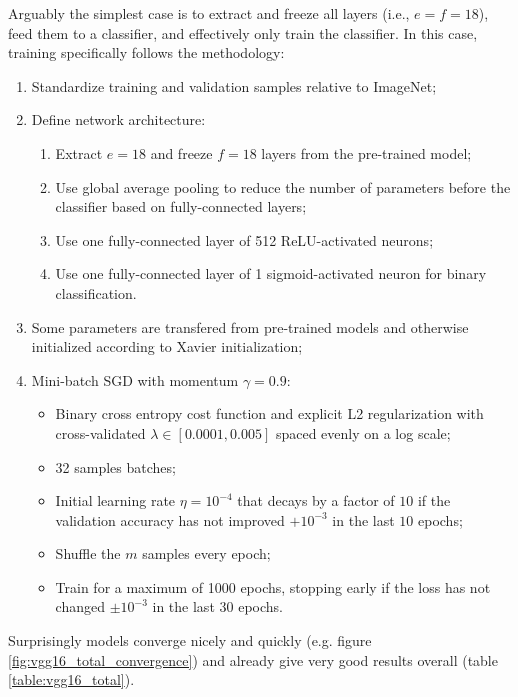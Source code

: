 Arguably the simplest case is to extract and freeze all layers (i.e., $e = f = 18$), feed them to a classifier, and effectively only train the classifier. In this case, training specifically follows the methodology:

\begin{enumerate}
    \item Standardize training and validation samples relative to ImageNet;
    \item Define network architecture:
        \begin{enumerate}
            \item Extract $e = 18$ and freeze $f = 18$ layers from the pre-trained model;
            \item Use global average pooling to reduce the number of parameters before the classifier based on fully-connected layers;
            \item Use one fully-connected layer of 512 ReLU-activated neurons;
            \item Use one fully-connected layer of 1 sigmoid-activated neuron for binary classification.
        \end{enumerate}
    \item Some parameters are transfered from pre-trained models and otherwise initialized according to Xavier initialization;
    \item Mini-batch \ac{SGD} with momentum $\gamma = 0.9$:
        \begin{itemize}
            \item Binary cross entropy cost function and explicit L2 regularization with cross-validated $\lambda \in [0.0001, 0.005]$ spaced evenly on a log scale;
            \item 32 samples batches;
            \item Initial learning rate $\eta = 10^{-4}$ that decays by a factor of $10$ if the validation accuracy has not improved $+10^{-3}$ in the last $10$ epochs;
            \item Shuffle the $m$ samples every epoch;
            \item Train for a maximum of 1000 epochs, stopping early if the loss has not changed $\pm 10^{-3}$ in the last $30$ epochs.
        \end{itemize}
\end{enumerate}

Surprisingly models converge nicely and quickly (e.g. figure \ref{fig:vgg16_total_convergence}) and already give very good results overall (table \ref{table:vgg16_total}).

